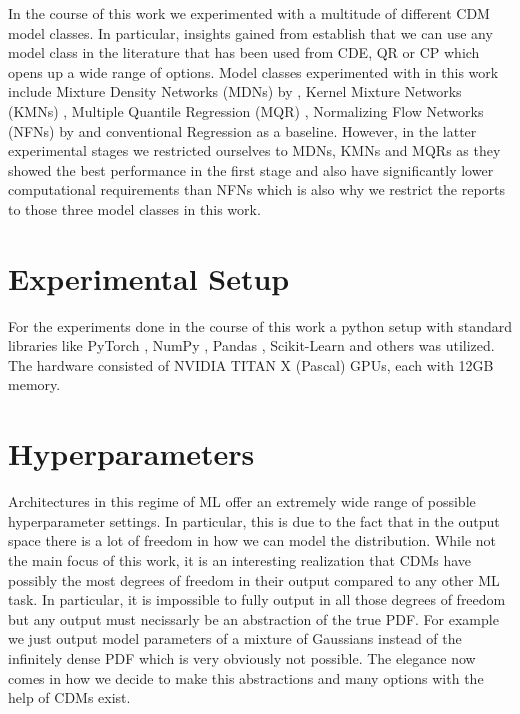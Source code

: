 In the course of this work we experimented with a multitude of different CDM model classes. In particular, insights gained from  establish that we can use any model class in the literature that has been used from CDE, QR or CP which opens up a wide range of options. Model classes experimented with in this work include Mixture Density Networks (MDNs) by \cite{bishop1994mixture}, Kernel Mixture Networks (KMNs) \cite{ambrogioni2017kernel}, Multiple Quantile Regression (MQR) \cite{gupta2022nested,moon2021learning}, Normalizing Flow Networks (NFNs) by \cite{trippe2018conditional} and conventional Regression as a baseline. However, in the latter experimental stages we restricted ourselves to MDNs, KMNs and MQRs as they showed the best performance in the first stage and also have significantly lower computational requirements than NFNs which is also why we restrict the reports to those three model classes in this work.

\section{Experimental Setup}\label{sec:experimental_setup}

For the experiments done in the course of this work a python setup with standard libraries like PyTorch \cite{paszke2019pytorch}, NumPy \cite{harris2020array}, Pandas \cite{reback2020pandas}, Scikit-Learn \cite{scikit-learn} and others was utilized. The hardware consisted of NVIDIA TITAN X (Pascal) GPUs, each with 12GB memory.

\section{Hyperparameters}\label{sec:hyperparameters}

Architectures in this regime of ML offer an extremely wide range of possible hyperparameter settings. In particular, this is due to the fact that in the output space there is a lot of freedom in how we can model the distribution. While not the main focus of this work, it is an interesting realization that CDMs have possibly the most degrees of freedom in their output compared to any other ML task. In particular, it is impossible to fully output in all those degrees of freedom but any output must necissarly be an abstraction of the true PDF. For example we just output model parameters of a mixture of Gaussians instead of the infinitely dense PDF which is very obviously not possible. The elegance now comes in how we decide to make this abstractions and many options with the help of CDMs exist.

